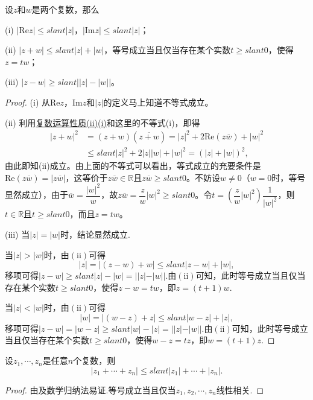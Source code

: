 \documentclass[../../main.tex]{subfiles}
\begin{document}
\begin{proposition}\label{proposition:复数基本不等式}
设\(z\)和\(w\)是两个复数，那么

(i) \(|\mathrm{Re}z| \leqslant slant |z|\)，\(|\mathrm{Im}z| \leqslant slant |z|\)；

(ii) \(|z + w| \leqslant slant |z| + |w|\)，等号成立当且仅当存在某个实数\(t \geqslant slant 0\)，使得\(z = tw\)；

(iii) \(|z - w| \geqslant slant \big||z| - |w|\big|\)。
\end{proposition}
\begin{proof}
(i) 从\(\mathrm{Re}z\)，\(\mathrm{Im}z\)和\(|z|\)的定义马上知道不等式成立。

(ii) 利用\hyperref[proposition:复数运算性质]{复数运算性质(ii)(i)}和这里的不等式(i)，即得
\[
\begin{split}
|z + w|^2 &= (z + w)(\overline{z + w}) = |z|^2 + 2\mathrm{Re}(z\overline{w}) + |w|^2 \\
& \leqslant slant |z|^2 + 2|z||w| + |w|^2 = (|z| + |w|)^2,
\end{split}
\]
由此即知(ii)成立。由上面的不等式可以看出，等式成立的充要条件是\(\mathrm{Re}(z\overline{w}) = |z\overline{w}|\)，这等价于$z\overline{w}\in \mathbb{R}$且\(z\overline{w} \geqslant slant 0\)。不妨设\(w \neq 0\)（\(w = 0\)时，等号显然成立），由于\(\overline{w} = \dfrac{|w|^2}{w}\)，故\(z\overline{w}=\dfrac{z}{w}|w|^2 \geqslant slant 0\)。令\(t = \left( \dfrac{z}{w}|w|^2 \right) \dfrac{1}{|w|^2}\)，则$t\in \mathbb{R}$且\(t \geqslant slant 0\)，而且\(z = tw\)。

(iii) 当\(| z | = | w |\)时，结论显然成立.

当\(| z | > | w |\)时，由\((\mathrm{ii})\)可得
\[| z | = | (z - w) + w | \leqslant slant | z - w | + | w |,\]
移项可得\(| z - w | \geqslant slant | z | - | w | = | | z | - | w | |\).由\((\mathrm{ii})\)可知，此时等号成立当且仅当存在某个实数\(t \geqslant slant 0\)，使得\(z - w = tw\)，即\(z = (t + 1)w\).

当\(| z | < | w |\)时，由\((\mathrm{ii})\)可得
\[| w | = | (w - z) + z | \leqslant slant | w - z | + | z |,\]
移项可得\(| z - w | = | w - z | \geqslant slant | w | - | z | = | | z | - | w | |\).由\((\mathrm{ii})\)可知，此时等号成立当且仅当存在某个实数\(t \geqslant slant 0\)，使得\(w - z = tz\)，即\(w = (t + 1)z\).
\end{proof}

\begin{corollary}
设\(z_1, \cdots, z_n\)是任意\(n\)个复数，则
\[
|z_1 + \cdots + z_n| \leqslant slant |z_1| + \cdots + |z_n|.
\]
\end{corollary}
\begin{proof}
由及数学归纳法易证.等号成立当且仅当$z_1,z_2,\cdots,z_n$线性相关.
\end{proof}
\end{document}
